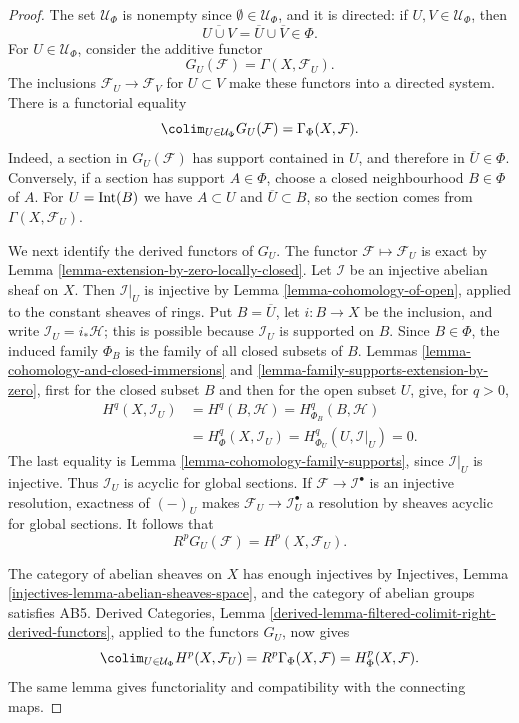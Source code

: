 \begin{proof}
The set $\mathcal{U}_\Phi$ is nonempty since
$\emptyset\in\mathcal{U}_\Phi$, and it is directed: if
$U,V\in\mathcal{U}_\Phi$, then
$$
\overline{U\cup V}=\overline{U}\cup\overline{V}\in\Phi.
$$
For $U\in\mathcal{U}_\Phi$, consider the additive functor
$$
G_U(\mathcal{F})=\Gamma(X,\mathcal{F}_U).
$$
The inclusions $\mathcal{F}_U\to\mathcal{F}_V$ for $U\subset V$ make these
functors into a directed system. There is a functorial equality
$$
\colim_{U\in\mathcal{U}_\Phi}G_U(\mathcal{F})
=\Gamma_\Phi(X,\mathcal{F}).
$$
Indeed, a section in $G_U(\mathcal{F})$ has support contained in $U$, and
therefore in $\overline{U}\in\Phi$. Conversely, if a section has support
$A\in\Phi$, choose a closed neighbourhood $B\in\Phi$ of $A$. For
$U=\mathop{\rm Int}(B)$ we have $A\subset U$ and
$\overline{U}\subset B$, so the section comes from
$\Gamma(X,\mathcal{F}_U)$.

We next identify the derived functors of $G_U$. The functor
$\mathcal{F}\mapsto\mathcal{F}_U$ is exact by Lemma
\ref{lemma-extension-by-zero-locally-closed}. Let $\mathcal{I}$ be an
injective abelian sheaf on $X$. Then $\mathcal{I}|_U$ is injective by
Lemma \ref{lemma-cohomology-of-open}, applied to the constant sheaves of
rings. Put $B=\overline{U}$, let $i:B\to X$ be the inclusion, and write
$\mathcal{I}_U=i_*\mathcal{H}$; this is possible because
$\mathcal{I}_U$ is supported on $B$. Since $B\in\Phi$, the induced family
$\Phi_B$ is the family of all closed subsets of $B$. Lemmas
\ref{lemma-cohomology-and-closed-immersions} and
\ref{lemma-family-supports-extension-by-zero}, first for the closed subset
$B$ and then for the open subset $U$, give, for $q>0$,
$$
\begin{aligned}
H^q(X,\mathcal{I}_U)
&=H^q(B,\mathcal{H})
=H^q_{\Phi_B}(B,\mathcal{H}) \\
&=H^q_\Phi(X,\mathcal{I}_U)
=H^q_{\Phi_U}(U,\mathcal{I}|_U)=0.
\end{aligned}
$$
The last equality is Lemma \ref{lemma-cohomology-family-supports}, since
$\mathcal{I}|_U$ is injective. Thus $\mathcal{I}_U$ is acyclic for global
sections. If $\mathcal{F}\to\mathcal{I}^\bullet$ is an injective
resolution, exactness of $(-)_U$ makes
$\mathcal{F}_U\to\mathcal{I}^\bullet_U$ a resolution by sheaves acyclic
for global sections. It follows that
$$
R^pG_U(\mathcal{F})=H^p(X,\mathcal{F}_U).
$$

The category of abelian sheaves on $X$ has enough injectives by Injectives,
Lemma \ref{injectives-lemma-abelian-sheaves-space}, and the category of
abelian groups satisfies AB5. Derived Categories, Lemma
\ref{derived-lemma-filtered-colimit-right-derived-functors}, applied to the
functors $G_U$, now gives
$$
\colim_{U\in\mathcal{U}_\Phi}H^p(X,\mathcal{F}_U)
=R^p\Gamma_\Phi(X,\mathcal{F})
=H^p_\Phi(X,\mathcal{F}).
$$
The same lemma gives functoriality and compatibility with the connecting
maps.
\end{proof}


